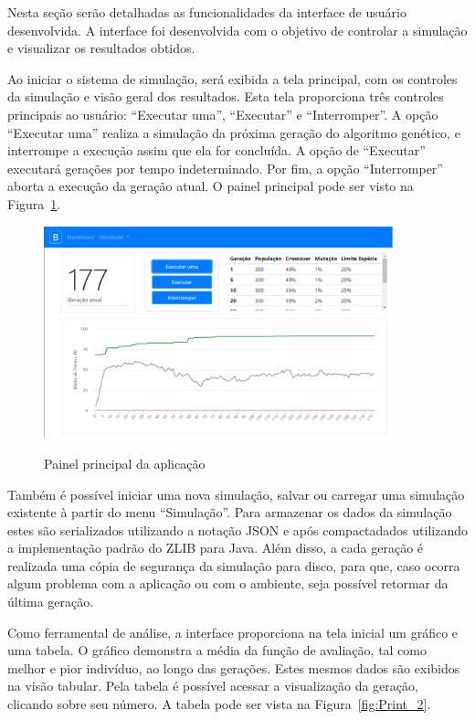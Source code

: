 \documentclass[12pt,oneside,a4paper,english,french,spanish,brazil,]{abntex2}
\begin{document}
Nesta seção serão detalhadas as funcionalidades da interface de usuário desenvolvida. A interface foi desenvolvida com o objetivo de controlar a simulação e visualizar os resultados obtidos. 

Ao iniciar o sistema de simulação, será exibida a tela principal, com os controles da simulação e visão geral dos resultados. Esta tela proporciona três controles principais ao usuário: ``Executar uma'', ``Executar'' e ``Interromper''. A opção ``Executar uma'' realiza a simulação da próxima geração do algoritmo genético, e interrompe a execução assim que ela for concluída. A opção de ``Executar'' executará gerações por tempo indeterminado. Por fim, a opção ``Interromper'' aborta a execução da geração atual. O painel principal pode ser visto na Figura~\ref{fig:Print_1}.

\begin{figure}[ht]
\centering
\caption{Painel principal da aplicação}
\includegraphics[width=0.9\textwidth]{imagens/Print_1.png}
\sourceAuthor{}
\label{fig:Print_1}
\end{figure}

Também é possível iniciar uma nova simulação, salvar ou carregar uma simulação existente à partir do menu ``Simulação''. Para armazenar os dados da simulação estes são serializados utilizando a notação JSON \cite{bray:2017} e após compactadados utilizando a implementação padrão do ZLIB \cite{deutsch:1996} para Java. Além disso, a cada geração é realizada uma cópia de segurança da simulação para disco, para que, caso ocorra algum problema com a aplicação ou com o ambiente, seja possível retormar da última geração.

Como ferramental de análise, a interface proporciona na tela inicial um gráfico e uma tabela. O gráfico demonstra a média da função de avaliação, tal como melhor e pior indivíduo, ao longo das gerações. Estes mesmos dados são exibidos na visão tabular. Pela tabela é possível acessar a visualização da geração, clicando sobre seu número. A tabela pode ser vista na Figura~\ref{fig:Print_2}.
\end{document}
